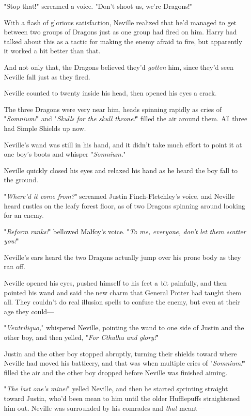 "Stop that!" screamed a voice. "Don't shoot us, we're Dragons!"

With a flash of glorious satisfaction, Neville realized that he'd managed to
get between two groups of Dragons just as one group had fired on him. Harry had
talked about this as a tactic for making the enemy afraid to fire, but
apparently it worked a bit better than that.

And not only that, the Dragons believed they'd \emph{gotten} him, since they'd
seen Neville fall just as they fired.

Neville counted to twenty inside his head, then opened his eyes a crack.

The three Dragons were very near him, heads spinning rapidly as cries of
"\emph{Somnium!}" and "\emph{Skulls for the skull throne!}" filled the air
around them. All three had Simple Shields up now.

Neville's wand was still in his hand, and it didn't take much effort to point
it at one boy's boots and whisper "\emph{Somnium.}"

Neville quickly closed his eyes and relaxed his hand as he heard the boy fall
to the ground.

"\emph{Where'd it come from?}" screamed Justin Finch-Fletchley's voice, and
Neville heard rustles on the leafy forest floor, as of two Dragons spinning
around looking for an enemy.

"\emph{Reform ranks!}" bellowed Malfoy's voice. "\emph{To me, everyone, don't
let them scatter you!}"

Neville's ears heard the two Dragons actually jump over his prone body as they
ran off.

Neville opened his eyes, pushed himself to his feet a bit painfully, and then
pointed his wand and said the new charm that General Potter had taught them
all. They couldn't do real illusion spells to confuse the enemy, but even at
their age they could---

"\emph{Ventriliquo,}" whispered Neville, pointing the wand to one side of
Justin and the other boy, and then yelled, "\emph{For Cthulhu and glory!}"

Justin and the other boy stopped abruptly, turning their shields toward where
Neville had moved his battlecry, and that was when multiple cries of
"\emph{Somnium!}" filled the air and the other boy dropped before Neville was
finished aiming.

"\emph{The last one's mine!}" yelled Neville, and then he started sprinting
straight toward Justin, who'd been mean to him until the older Hufflepuffs
straightened him out. Neville was surrounded by his comrades and \emph{that}
meant---


